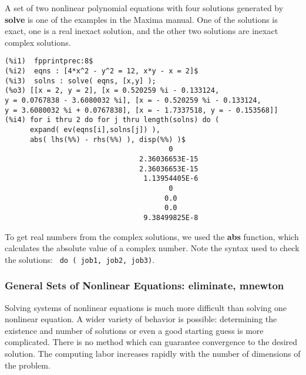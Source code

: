 \documentclass[12pt]{article}
\begin{document}
  \smallskip
A set of two nonlinear polynomial equations with four solutions generated 
  by \textbf{solve} is one of the examples in the Maxima manual.
One of the solutions is exact, one is a real inexact solution, and the other two
  solutions are inexact complex solutions.
\small
\begin{verbatim}
(%i1)  fpprintprec:8$
(%i2)  eqns : [4*x^2 - y^2 = 12, x*y - x = 2]$
(%i3)  solns : solve( eqns, [x,y] );
(%o3) [[x = 2, y = 2], [x = 0.520259 %i - 0.133124,
y = 0.0767838 - 3.6080032 %i], [x = - 0.520259 %i - 0.133124,
y = 3.6080032 %i + 0.0767838], [x = - 1.7337518, y = - 0.153568]]
(%i4) for i thru 2 do for j thru length(solns) do (
      expand( ev(eqns[i],solns[j]) ),
      abs( lhs(%%) - rhs(%%) ), disp(%%) )$
                                       0
                                2.36036653E-15
                                2.36036653E-15
                                 1.13954405E-6
                                       0
                                      0.0
                                      0.0
                                 9.38499825E-8
\end{verbatim}
\normalsize
To get real numbers from the complex solutions, we used the \textbf{abs}
   function, which calculates the absolute value of a complex number.
Note the syntax used to check the solutions: \verb| do ( job1, job2, job3)|.

\newpage

\subsubsection{General Sets of Nonlinear Equations: eliminate, mnewton}
Solving systems of nonlinear equations is much more difficult than solving
  one nonlinear equation.
A wider variety of behavior is possible: determining the existence and
  number of solutions or even a good starting guess is more complicated.
There is no method which can guarantee convergence to the desired solution.
The computing labor increases rapidly with the number of dimensions of the problem.
\end{document}
